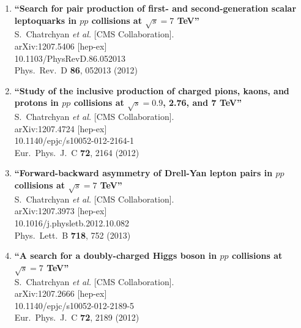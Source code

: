 \documentclass{article}
\begin{document}
\begin{enumerate}
\item%
{\bf ``Search for pair production of first- and second-generation scalar leptoquarks in $pp$ collisions at $\sqrt{s}= 7$ TeV''}
  \\{}S.~Chatrchyan {\it et al.}  [CMS Collaboration].
  \\{}arXiv:1207.5406 [hep-ex]
    \\{}10.1103/PhysRevD.86.052013
\\{}Phys.\ Rev.\ D {\bf 86}, 052013 (2012) %


\item%
{\bf ``Study of the inclusive production of charged pions, kaons, and protons in $pp$ collisions at $\sqrt{s}=0.9$, 2.76, and 7 TeV''}
  \\{}S.~Chatrchyan {\it et al.}  [CMS Collaboration].
  \\{}arXiv:1207.4724 [hep-ex]
    \\{}10.1140/epjc/s10052-012-2164-1
\\{}Eur.\ Phys.\ J.\ C {\bf 72}, 2164 (2012) %


\item%
{\bf ``Forward-backward asymmetry of Drell-Yan lepton pairs in $pp$ collisions at $\sqrt{s} = 7$ TeV''}
  \\{}S.~Chatrchyan {\it et al.}  [CMS Collaboration].
  \\{}arXiv:1207.3973 [hep-ex]
    \\{}10.1016/j.physletb.2012.10.082
\\{}Phys.\ Lett.\ B {\bf 718}, 752 (2013) %


\item%
{\bf ``A search for a doubly-charged Higgs boson in $pp$ collisions at $\sqrt{s}=7$ TeV''}
  \\{}S.~Chatrchyan {\it et al.}  [CMS Collaboration].
  \\{}arXiv:1207.2666 [hep-ex]
    \\{}10.1140/epjc/s10052-012-2189-5
\\{}Eur.\ Phys.\ J.\ C {\bf 72}, 2189 (2012) %



\end{enumerate}
\end{document}
